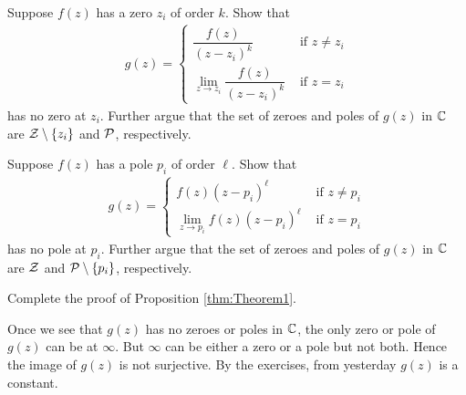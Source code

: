 \documentclass{article}
\begin{document}
\begin{qbox}
  Suppose $f(z)$ has a zero $z_i$ of order $k$. Show that
  \begin{align*}
    g(z) = \begin{cases}
        \dfrac{f(z)}{(z - z_i)^k} & \mbox{ if }z \neq z_i \\
        \lim \limits_{z \rightarrow z_i} \dfrac{f(z)}{(z - z_i)^k} & \mbox{ if } z = z_i
    \end{cases}
  \end{align*}
  has no zero at $z_i$.
  Further argue that the set of zeroes and poles of $g(z)$ in $\mathbb{C}$ are $\mathcal{Z} \setminus \left\{z_i\right\}$ and $\mathcal{P}$, respectively.
\end{qbox}


\begin{qbox}
  Suppose $f(z)$ has a pole $p_i$ of order $\ell$. Show that
  \begin{align*}
    g(z) = \begin{cases}
        f(z) (z - p_i)^\ell & \mbox{ if }z \neq p_i \\
        \lim \limits_{z \rightarrow p_i} f(z) (z - p_i)^\ell & \mbox{ if } z = p_i
    \end{cases}
  \end{align*}
  has no pole at $p_i$.
  Further argue that the set of zeroes and poles of $g(z)$ in $\mathbb{C}$ are $\mathcal{Z}$ and $\mathcal{P} \setminus \left\{p_i\right\}$, respectively.
\end{qbox}

\begin{qbox}
  Complete the proof of Proposition \ref{thm:Theorem1}.
\end{qbox}

Once we see that $g(z)$ has no zeroes or poles in $\mathbb{C}$, the only zero or pole of $g(z)$ can be at $\infty$. But $\infty$ can be either a zero or a pole but not both.
Hence the image of $g(z)$ is not surjective. By the exercises, from yesterday $g(z)$ is a constant.
\end{document}
